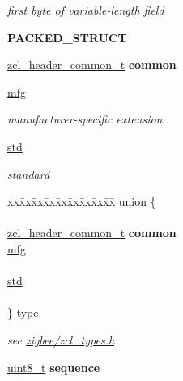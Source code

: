 \begin{DoxyCompactItemize}
\begin{DoxyCompactList}\small\item\em first byte of variable-\/length field \end{DoxyCompactList}\item 
{\bfseries P\-A\-C\-K\-E\-D\-\_\-\-S\-T\-R\-U\-C\-T}
\item 
\hyperlink{group__zcl_gaece1b64b04ac629f83358d6d815451a5}{zcl\-\_\-header\-\_\-common\-\_\-t} {\bfseries common}
\item 
\hyperlink{group__zcl_gacef7f7e36d411b8000d1ac172c5e8782}{mfg}
\begin{DoxyCompactList}\small\item\em manufacturer-\/specific extension \end{DoxyCompactList}\item 
\hyperlink{group__zcl_ga36fda9bc88c532ecc94200bcd756b1d3}{std}
\begin{DoxyCompactList}\small\item\em standard \end{DoxyCompactList}\item 
\begin{tabbing}
xx\=xx\=xx\=xx\=xx\=xx\=xx\=xx\=xx\=\kill
union \{\\
\\
\>\hyperlink{group__zcl_gaece1b64b04ac629f83358d6d815451a5}{zcl\_header\_common\_t} {\bfseries common}\\
\>\hyperlink{group__zcl_gacef7f7e36d411b8000d1ac172c5e8782}{mfg}\\
\>\\
\>\hyperlink{group__zcl_ga36fda9bc88c532ecc94200bcd756b1d3}{std}\\
\>\\
\} \hyperlink{group__zcl_ga1d127017fb298b889f4ba24752d08b8e}{type}\\

\end{tabbing}\begin{DoxyCompactList}\small\item\em see \hyperlink{zcl__types_8h}{zigbee/zcl\-\_\-types.\-h} \end{DoxyCompactList}\item 
\hypertarget{group__zcl_gacb5c8866a58116314f6c8eda9dc3544c}{\hyperlink{group__hal_gae1affc9ca37cfb624959c866a73f83c2}{uint8\-\_\-t} {\bfseries sequence}}\label{group__zcl_gacb5c8866a58116314f6c8eda9dc3544c}


\end{DoxyCompactItemize}
